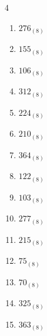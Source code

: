 \begin{multicols}{4}
\begin{enumerate}
        \phantom{$=57$}

  \item $276_{(8)}$

        \phantom{$=190$}

  \item $155_{(8)}$

        \phantom{$=109$}

  \item $106_{(8)}$

        \phantom{$=70$}

  \item $312_{(8)}$

        \phantom{$=202$}

  \item $224_{(8)}$

        \phantom{$=148$}

  \item $210_{(8)}$

        \phantom{$=136$}

  \item $364_{(8)}$

        \phantom{$=244$}

  \item $122_{(8)}$

        \phantom{$=82$}

  \item $103_{(8)}$

        \phantom{$=67$}

\columnbreak %

  \item $277_{(8)}$

        \phantom{$=191$}

  \item $215_{(8)}$

        \phantom{$=141$}

  \item $75_{(8)}$

        \phantom{$=61$}

  \item $70_{(8)}$

        \phantom{$=56$}

  \item $325_{(8)}$

        \phantom{$=213$}

  \item $363_{(8)}$

        \phantom{$=243$}


\end{enumerate}
\end{multicols}

